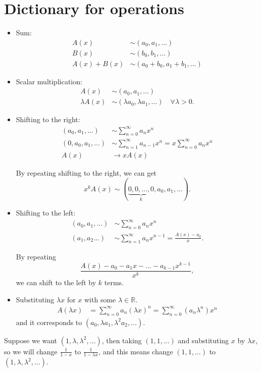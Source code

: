\section{Dictionary for operations}
\begin{itemize}
    \item Sum: 
    \begin{align*}
        A(x) &\sim (a_0, a_1, \dots ) \\
        B(x) &\sim (b_0, b_1, \dots ) \\
        A(x) + B(x) &\sim (a_0 + b_0, a_1 + b_1, \dots )
    \end{align*}
    \item Scalar multiplication: 
    \begin{align*}
        A(x) &\sim (a_0, a_1, \dots ) \\
        \lambda A(x) &\sim  (\lambda a_0, \lambda a_1, \dots ) \quad \forall \lambda > 0. 
    \end{align*}
    \item Shifting to the right:
    \begin{align*}
        (a_0, a_1, \dots ) &\sim \sum_{n=0}^{\infty} a_n x^n \\
        (0, a_0, a_1, \dots ) &\sim \sum_{n=1}^{\infty} a_{n-1} x^n = x \sum_{n=0}^{\infty} a_n x^n \\
        A(x) &\to x A(x)  
    \end{align*}
    \begin{note}
        By repeating shifting to the right, we can get 
        \[
            x^k A(x) \sim ( \underbrace{0,0, \dots ,0}_{k}, a_0, a_1, \dots  ).  
        \]
    \end{note}
    \item Shifting to the left: 
    \begin{align*}
        (a_0, a_1, \dots ) &\sim \sum_{n=0}^{\infty} a_n x^n \\
        (a_1, a_2 \dots ) &\sim \sum_{n=1}^{\infty} a_n x^{n-1} = \frac{A(x) - a_0}{x}.  
    \end{align*}
    \begin{note}
        By repeating 
        \[
            \frac{A(x) - a_0 - a_1 x - \dots - a_{k-1} x^{k-1}}{x^k},
        \] we can shift to the left by \(k\) terms. 
    \end{note}
    \item Substituting \(\lambda x\) for \(x\) with some \(\lambda \in \mathbb{R} \). 
    \begin{align*}
        A(\lambda x) &= \sum_{n=0}^{\infty} a_n \left( \lambda x \right)^n = \sum_{n=0}^{\infty} \left( a_n \lambda ^n \right) x^n     
    \end{align*}
    and it corresponds to \((a_0, \lambda a_1, \lambda ^2 a_2, \dots )\). 
\end{itemize}

\begin{eg}
    Suppose we want \((1, \lambda , \lambda ^2, \dots )\), then taking \((1, 1, \dots )\) and substituting \(x\) by \(\lambda x\), so we will change \(\frac{1}{1-x}\) to \(\frac{1}{1-\lambda x}\), and this means change \((1,1,\dots )\) to \((1, \lambda , \lambda ^2, \dots )\).     
\end{eg}
